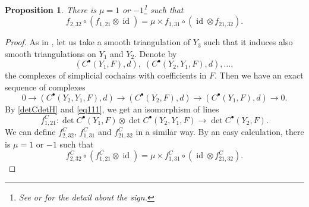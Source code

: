 \documentclass[JEP,XML,SOM,Unicode]{cedram}
\newcommand{\sbullet}{{\scriptscriptstyle\bullet}}
\theoremstyle{plain}
\newtheorem{prop}[lem]{Proposition}
\theoremstyle{definition}
\theoremstyle{remark}
\DeclareMathOperator{\id}{id}
\begin{document}
\begin{prop}\label{propFp}
There is $\mu=1$ or $-1$\footnote{See \cite[Rem.\,1.2]{BGS1} or
\cite{KM76} for the detail about the sign. } such that
\begin{equation}\label{mabu}
f_{2,32} \circ(f_{1,21}\otimes\id) = \mu \times
f_{1,31}\circ (\id \otimes f_{21,32}).
\end{equation}
\end{prop}
\begin{proof}
As in \cite[(0.15)]{BruningMa_2012}, let us take a smooth triangulation
of $Y_{3}$ such that it induces also smooth triangulations on
$Y_{1}$ and $Y_{2}$. Denote by
\[
(C^{\sbullet}(Y_{1},F),d),\;
(C^{\sbullet}(Y_{2},Y_{1},F),d), \ldots,
\]
the complexes of simplicial
cochains with coefficients in $F$. Then we have an exact sequence of
complexes
\begin{equation}\label{eq111}
0\to (C^{\sbullet}(Y_{2},Y_{1},F),d)\to (C^{\sbullet}(Y_{2},F),d)\to
(C^{\sbullet}(Y_{1},F),d)\to 0.
\end{equation}
By \eqref{detCdetH} and \eqref{eq111}, we get an isomorphism of lines
\begin{equation*}
f^{C}_{1,21}: \det C^{\sbullet}(Y_{1},F)\otimes \det
C^{\sbullet}(Y_{2},Y_{1},F)\to \det C^{\sbullet}(Y_{2},F).
\end{equation*}
We can define $f^{C}_{2,32}$, $f^{C}_{1,31}$ and $f^{C}_{21,32}$ in a
similar way. By an easy calculation, there is $\mu=1$ or $-1$ such that
\begin{equation}\label{mabuC}
f_{2,32}^{C} \circ(f_{1,21}^{C}\otimes\id) = \mu \times
f_{1,31}^{C}\circ (\id \otimes f_{21,32}^{C}).
\end{equation}


\end{proof}
\end{document}

